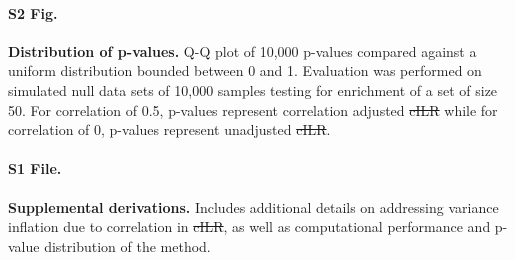 \documentclass[10pt,letterpaper]{article}
\providecommand{\DIFaddtex}[1]{{\protect\color{blue}\uwave{#1}}} %
\providecommand{\DIFdeltex}[1]{{\protect\color{red}\sout{#1}}}                      %
\providecommand{\DIFaddbegin}{} %
\providecommand{\DIFaddend}{} %
\providecommand{\DIFdelbegin}{} %
\providecommand{\DIFdelend}{} %
\providecommand{\DIFadd}[1]{\texorpdfstring{\DIFaddtex{#1}}{#1}} %
\providecommand{\DIFdel}[1]{\texorpdfstring{\DIFdeltex{#1}}{}} %
\newcommand{\DIFscaledelfig}{0.5}
\newlength{\DIFdelgraphicswidth} %
\newlength{\DIFdelgraphicsheight} %
\newcommand{\DIFaddincludegraphics}[2][]{{\color{blue}\fbox{\DIFOincludegraphics[#1]{#2}}}} %
\newcommand{\DIFdelincludegraphics}[2][]{%
\sbox{\DIFdelgraphicsbox}{\DIFOincludegraphics[#1]{#2}}%
\settoboxwidth{\DIFdelgraphicswidth}{\DIFdelgraphicsbox} %
\settoboxtotalheight{\DIFdelgraphicsheight}{\DIFdelgraphicsbox} %
\scalebox{\DIFscaledelfig}{%
\parbox[b]{\DIFdelgraphicswidth}{\usebox{\DIFdelgraphicsbox}\\[-\baselineskip] \rule{\DIFdelgraphicswidth}{0em}}\llap{\resizebox{\DIFdelgraphicswidth}{\DIFdelgraphicsheight}{%
\setlength{\unitlength}{\DIFdelgraphicswidth}%
\begin{picture}(1,1)%
\thicklines\linethickness{2pt} %
{\color[rgb]{1,0,0}\put(0,0){\framebox(1,1){}}}%
{\color[rgb]{1,0,0}\put(0,0){\line( 1,1){1}}}%
{\color[rgb]{1,0,0}\put(0,1){\line(1,-1){1}}}%
\end{picture}%
}\hspace*{3pt}}} %
} %
\DeclareRobustCommand{\DIFaddbegin}{\DIFOaddbegin \let\includegraphics\DIFaddincludegraphics} %
\DeclareRobustCommand{\DIFaddend}{\DIFOaddend \let\includegraphics\DIFOincludegraphics} %
\DeclareRobustCommand{\DIFdelbegin}{\DIFOdelbegin \let\includegraphics\DIFdelincludegraphics} %
\DeclareRobustCommand{\DIFdelend}{\DIFOaddend \let\includegraphics\DIFOincludegraphics} %
\begin{document}
\paragraph*{S2 Fig.}
\label{S2_Fig}
{\bf Distribution of p-values.} Q-Q plot of 10,000 p-values compared against a uniform distribution bounded between 0 and 1. Evaluation was performed on simulated null data sets of 10,000 samples testing for enrichment of a set of size 50. For correlation of 0.5, p-values represent correlation adjusted \DIFdelbegin \DIFdel{cILR }\DIFdelend \DIFaddbegin \DIFadd{CBEA }\DIFaddend while for correlation of 0, p-values represent unadjusted \DIFdelbegin \DIFdel{cILR}\DIFdelend \DIFaddbegin \DIFadd{CBEA}\DIFaddend . 

\paragraph*{S1 File.}
\label{S1_File}
{\bf Supplemental derivations.} Includes additional details on addressing variance inflation due to correlation in \DIFdelbegin \DIFdel{cILR}\DIFdelend \DIFaddbegin \DIFadd{CBEA}\DIFaddend , as well as computational performance and p-value distribution of the method.   
\end{document}
